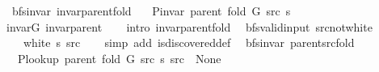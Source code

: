 \begin{isabellebody}
\endisatagproof
{\isafoldproof}%
%
\isadelimproof
\isanewline
%
\endisadelimproof
\isanewline
{}\isamarkupfalse%
\ {\isacharparenleft}{\kern0pt}\ bfs{\isacharunderscore}{\kern0pt}invar{\isacharparenright}{\kern0pt}\ invar{\isacharunderscore}{\kern0pt}parent{\isacharunderscore}{\kern0pt}fold{\isacharcolon}{\kern0pt}\isanewline
\ \ \ {\isachardoublequoteopen}P{\isacharunderscore}{\kern0pt}invar\ {\isacharparenleft}{\kern0pt}parent\ {\isacharparenleft}{\kern0pt}fold\ G\ src\ s{\isacharparenright}{\kern0pt}{\isacharparenright}{\kern0pt}{\isachardoublequoteclose}\isanewline
%
\isadelimproof
\ \ %
\endisadelimproof
%
\isatagproof
{}\isamarkupfalse%
\ invar{\isacharunderscore}{\kern0pt}G\ invar{\isacharunderscore}{\kern0pt}parent\isanewline
\ \ \isamarkupfalse%
\ {\isacharparenleft}{\kern0pt}intro\ invar{\isacharunderscore}{\kern0pt}parent{\isacharunderscore}{\kern0pt}fold{\isacharunderscore}{\kern0pt}{}{\isacharparenright}{\kern0pt}%
\endisatagproof
{\isafoldproof}%
%
\isadelimproof
\isanewline
%
\endisadelimproof
%
\isadeliminvisible
\isanewline
%
\endisadeliminvisible
%
\isataginvisible
{}\isamarkupfalse%
\ {\isacharparenleft}{\kern0pt}\ bfs{\isacharunderscore}{\kern0pt}valid{\isacharunderscore}{\kern0pt}input{\isacharparenright}{\kern0pt}\ src{\isacharunderscore}{\kern0pt}not{\isacharunderscore}{\kern0pt}white{\isacharcolon}{\kern0pt}\isanewline
\ \ \ {\isachardoublequoteopen}{\isasymnot}\ white\ s\ src{\isachardoublequoteclose}%
\endisataginvisible
{\isafoldinvisible}%
%
\isadeliminvisible
\isanewline
%
\endisadeliminvisible
%
\isadelimproof
\ \ %
\endisadelimproof
%
\isatagproof
{}\isamarkupfalse%
\ {\isacharparenleft}{\kern0pt}simp\ add{\isacharcolon}{\kern0pt}\ is{\isacharunderscore}{\kern0pt}discovered{\isacharunderscore}{\kern0pt}def{\isacharparenright}{\kern0pt}%
\endisatagproof
{\isafoldproof}%
%
\isadelimproof
\isanewline
%
\endisadelimproof
\isanewline
{}\isamarkupfalse%
\ {\isacharparenleft}{\kern0pt}\ bfs{\isacharunderscore}{\kern0pt}invar{\isacharparenright}{\kern0pt}\ parent{\isacharunderscore}{\kern0pt}src{\isacharunderscore}{\kern0pt}fold{\isacharcolon}{\kern0pt}\isanewline
\ \ \ {\isachardoublequoteopen}P{\isacharunderscore}{\kern0pt}lookup\ {\isacharparenleft}{\kern0pt}parent\ {\isacharparenleft}{\kern0pt}fold\ G\ src\ s{\isacharparenright}{\kern0pt}{\isacharparenright}{\kern0pt}\ src\ {\isacharequal}{\kern0pt}\ None{\isachardoublequoteclose}\isanewline

\end{isabellebody}
